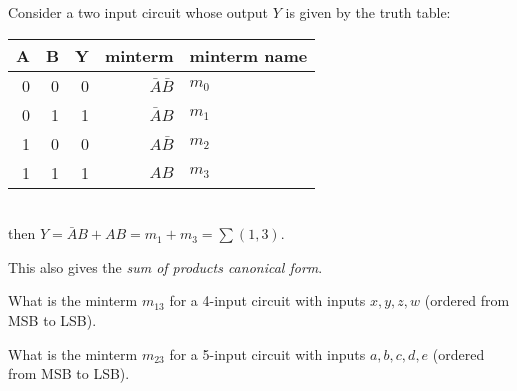 \noindent Consider a two input circuit whose output $Y$ is given by the truth table:\\
\begin{tabular}{rrrrp{20mm}}
  \toprule
  A & B &  Y & minterm & minterm name\\
  \midrule
  0 & 0 & 0 & $\bar{A} \bar{B}$ & $m_0$ \\
  0 & 1 & 1 & $\bar{A}      B $ & $m_1$ \\
  1 & 0 & 0 & $     A  \bar{B}$ & $m_2$ \\
  1 & 1 & 1 & $     A       B $ & $m_3$ \\
  \bottomrule
\end{tabular}\\[1em]
then $Y = \bar{A}      B  + A B = m_1 + m_3 = \sum (1, 3)$.

\noindent This also gives the \emph{sum of products canonical form}.

\begin{example}
  What is the minterm $m_{13}$ for a 4-input circuit with inputs $x, y, z, w$
  (ordered from MSB to LSB).
\end{example}
\vspace{10em}


\begin{prob}[5 marks]
  What is the minterm $m_{23}$ for a 5-input circuit with inputs $a, b, c, d, e$
  (ordered from MSB to LSB).
\end{prob}
\vspace{10em}

